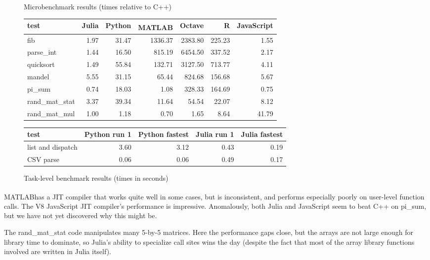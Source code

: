 \documentclass[9pt]{sigplanconf}
\newcommand{\Matlab}{MATLAB\textsuperscript{\tiny\textregistered}}
\begin{document}
\begin{figure*}
\caption{Microbenchmark results (times relative to C++)}
\label{mbr}
\begin{center}

\begin{tabular}{|l|r|r|r|r|r|r|}\hline
test & Julia & Python & \Matlab & Octave & R & JavaScript \\
\hline \hline
fib        & 1.97 & 31.47 & 1336.37  & 2383.80 & 225.23 & 1.55 \\
\hline
parse\_int & 1.44 & 16.50 &  815.19  & 6454.50 & 337.52 & 2.17 \\
\hline
quicksort  & 1.49 & 55.84 &  132.71  & 3127.50 & 713.77 & 4.11 \\
\hline
mandel     & 5.55 & 31.15 &   65.44  &  824.68 & 156.68 & 5.67 \\
\hline
pi\_sum    & 0.74 & 18.03 &    1.08  &  328.33 & 164.69 & 0.75 \\
\hline
rand\_mat\_stat & 3.37 & 39.34 & 11.64 & 54.54 &  22.07 & 8.12 \\
\hline
rand\_mat\_mul  & 1.00 &  1.18 &  0.70 &  1.65 &   8.64 & 41.79 \\
\hline
\end{tabular}

\vspace{0.5cm}

\caption{Task-level benchmark results (times in seconds)}
\begin{tabular}{|l|r|r|r|r|}\hline
test              & Python run 1 & Python fastest & Julia run 1 & Julia fastest\\
\hline \hline
list and dispatch & 3.60         & 3.12           & 0.43        & 0.19 \\
\hline
CSV parse         & 0.06         & 0.06           & 0.49        & 0.17 \\
\hline
\end{tabular}

\end{center}
\end{figure*}


\Matlab has a JIT compiler
that works quite well in some cases, but is inconsistent, and
performs especially poorly on user-level function calls. The V8
JavaScript JIT compiler's performance is impressive. Anomalously, both
Julia and JavaScript seem to beat C++ on pi\_sum, but we have not yet
discovered why this might be.

The rand\_mat\_stat code manipulates many 5-by-5 matrices. Here the
performance gaps close, but the arrays are not large enough for
library time to dominate, so Julia's ability to specialize call sites
wins the day (despite the fact that most of the array library functions
involved are written in Julia itself).
\end{document}
